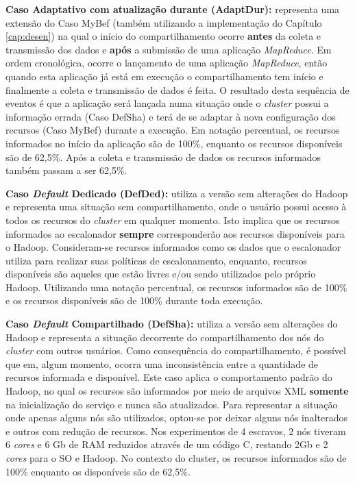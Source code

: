 \textbf{Caso Adaptativo com atualização durante (AdaptDur):} representa uma extensão do Caso MyBef (também utilizando a implementação do Capítulo \ref{cap:desen}) na qual o início do compartilhamento ocorre \textbf{antes} da coleta e transmissão dos dados e \textbf{após} a submissão de uma aplicação \textit{MapReduce}. Em ordem cronológica, ocorre o lançamento de uma aplicação \textit{MapReduce}, então quando esta aplicação já está em execução o compartilhamento tem início e finalmente a coleta e transmissão de dados é feita. O resultado desta sequência de eventos é que a aplicação será lançada numa situação onde o \textit{cluster} possui a informação errada (Caso DefSha) e terá de se adaptar à nova configuração dos recursos (Caso MyBef) durante a execução. Em notação percentual, os recursos informados no início da aplicação são de 100\%, enquanto os recursos disponíveis são de 62,5\%. Após a coleta e transmissão de dados os recursos informados também passam a ser 62,5\%.

\textbf{Caso \textit{Default} Dedicado (DefDed):} utiliza a versão sem alterações do Hadoop e representa uma situação sem compartilhamento, onde o usuário possui acesso à todos os recursos do \textit{cluster} em qualquer momento. Isto implica que os recursos informados ao escalonador \textbf{sempre} corresponderão aos recursos disponíveis para o Hadoop. Consideram-se recursos informados como os dados que o escalonador utiliza para realizar suas políticas de escalonamento, enquanto, recursos disponíveis são aqueles que estão livres e/ou sendo utilizados pelo próprio Hadoop. Utilizando uma notação percentual, os recursos informados são de 100\% e os recursos disponíveis são de 100\% durante toda execução.

\textbf{Caso \textit{Default} Compartilhado (DefSha):} utiliza a versão sem alterações do Hadoop e representa a situação decorrente do compartilhamento dos nós do \textit{cluster} com outros usuários. Como consequência do compartilhamento, é possível que em, algum momento, ocorra uma inconsistência entre a quantidade de recursos informada e disponível. Este caso aplica o comportamento padrão do Hadoop, no qual os recursos são informados por meio de arquivos XML \textbf{somente} na inicialização do serviço e nunca são atualizados. Para representar a situação onde apenas alguns nós são utilizados, optou-se por deixar alguns nós inalterados e outros com redução de recursos. Nos experimentos de 4 escravos, 2 nós tiveram 6 \textit{cores} e 6 Gb de RAM reduzidos através de um código C, restando 2Gb e 2 \textit{cores} para o SO e Hadoop. No contexto do cluster, os recursos informados são de 100\% enquanto os disponíveis são de 62,5\%.

